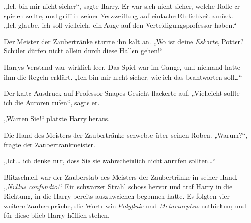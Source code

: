 „Ich bin mir nicht sicher“, sagte Harry.
Er war sich nicht sicher, welche Rolle er spielen sollte, und griff in seiner Verzweiflung auf einfache Ehrlichkeit zurück.
„Ich glaube, ich soll vielleicht ein Auge auf den Verteidigungsprofessor haben.“

Der Meister der Zaubertränke starrte ihn kalt an.
„Wo ist deine \emph{Eskorte}, Potter? Schüler dürfen nicht allein durch diese Hallen gehen!“

Harrys Verstand war wirklich leer. Das Spiel war im Gange, und niemand hatte ihm die Regeln erklärt. „Ich bin mir nicht sicher, wie ich das beantworten soll…“

Der kalte Ausdruck auf Professor Snapes Gesicht flackerte auf. „Vielleicht sollte ich die Auroren rufen“, sagte er.

„Warten Sie!“ platzte Harry heraus.

Die Hand des Meisters der Zaubertränke schwebte über seinen Roben.
„Warum?“, fragte der Zaubertrankmeister.

„Ich… ich denke nur, dass Sie sie wahrscheinlich nicht anrufen sollten…“

Blitzschnell war der Zauberstab des Meisters der Zaubertränke in seiner Hand.
„\emph{Nullus confundio!}“
Ein schwarzer Strahl schoss hervor und traf Harry in die Richtung, in die Harry bereits auszuweichen begonnen hatte. Es folgten vier weitere Zaubersprüche, die Worte wie \emph{Polyfluis} und \emph{Metamorphus} enthielten; und für diese blieb Harry höflich stehen.

